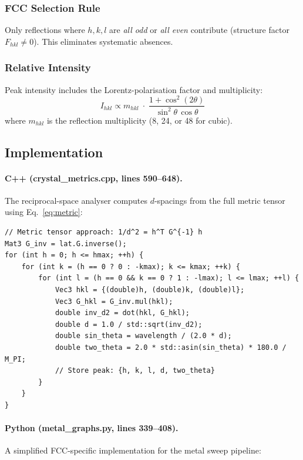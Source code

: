 \documentclass[11pt,a4paper]{article}
\begin{document}
\subsubsection{FCC Selection Rule}

Only reflections where $h,k,l$ are \emph{all odd} or \emph{all even}
contribute (structure factor $F_{hkl} \neq 0$).  This eliminates
systematic absences.

\subsubsection{Relative Intensity}

Peak intensity includes the Lorentz-polarisation factor and multiplicity:
\begin{equation}
  I_{hkl} \propto m_{hkl}\;\cdot\;
  \frac{1+\cos^{2}(2\theta)}{\sin^{2}\theta\,\cos\theta}
  \label{eq:lp}
\end{equation}
where $m_{hkl}$ is the reflection multiplicity (8, 24, or 48 for cubic).

\subsection{Implementation}

\paragraph{C++ (crystal\_metrics.cpp, lines 590--648).}
The reciprocal-space analyser computes $d$-spacings from the full metric
tensor using Eq.~\eqref{eq:metric}:

\begin{lstlisting}[style=cpp,title={\textbf{C++ --- Reciprocal-space d-spacing computation}}]
// Metric tensor approach: 1/d^2 = h^T G^{-1} h
Mat3 G_inv = lat.G.inverse();
for (int h = 0; h <= hmax; ++h) {
    for (int k = (h == 0 ? 0 : -kmax); k <= kmax; ++k) {
        for (int l = (h == 0 && k == 0 ? 1 : -lmax); l <= lmax; ++l) {
            Vec3 hkl = {(double)h, (double)k, (double)l};
            Vec3 G_hkl = G_inv.mul(hkl);
            double inv_d2 = dot(hkl, G_hkl);
            double d = 1.0 / std::sqrt(inv_d2);
            double sin_theta = wavelength / (2.0 * d);
            double two_theta = 2.0 * std::asin(sin_theta) * 180.0 / M_PI;
            // Store peak: {h, k, l, d, two_theta}
        }
    }
}
\end{lstlisting}

\paragraph{Python (metal\_graphs.py, lines 339--408).}
A simplified FCC-specific implementation for the metal sweep pipeline:
\end{document}
